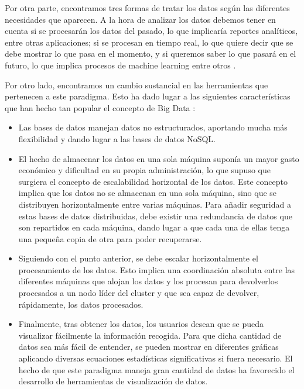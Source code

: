 Por otra parte, encontramos tres formas de tratar los datos según las
diferentes necesidades que aparecen. A la hora de analizar los datos
debemos tener en cuenta si se procesarán los datos del pasado, lo que
implicaría reportes analíticos, entre otras aplicaciones; si se procesan en
tiempo real, lo que quiere decir que se debe mostrar lo que pasa en el
momento, y si queremos saber lo que pasará en el futuro, lo que implica
procesos de machine learning entre otros \cite{BD-3}.

Por otro lado, encontramos un cambio sustancial en las herramientas que
pertenecen a este paradigma. Esto ha dado lugar a las siguientes
características que han hecho tan popular el concepto de Big Data
\cite{BD-6}:

\begin{itemize}
\item Las bases de datos manejan datos no estructurados, aportando mucha
  más flexibilidad y dando lugar a las bases de datos NoSQL.
\item El hecho de almacenar los datos en una sola máquina suponía un mayor
  gasto económico y dificultad en su propia administración, lo que supuso
  que surgiera el concepto de escalabilidad horizontal de los datos. Este
  concepto implica que los datos no se almacenan en una sola máquina, sino
  que se distribuyen horizontalmente entre varias máquinas. Para añadir
  seguridad a estas bases de datos distribuidas, debe existir una
  redundancia de datos que son repartidos en cada máquina, dando lugar a
  que cada una de ellas tenga una pequeña copia de otra para poder
  recuperarse.
\item Siguiendo con el punto anterior, se debe escalar horizontalmente el
  procesamiento de los datos. Esto implica una coordinación absoluta entre
  las diferentes máquinas que alojan los datos y los procesan para
  devolverlos procesados a un nodo líder del cluster y que sea capaz de
  devolver, rápidamente, los datos procesados.
\item Finalmente, tras obtener los datos, los usuarios desean que se pueda
  visualizar fácilmente la información recogida. Para que dicha cantidad de
  datos sea más fácil de entender, se pueden mostrar en diferentes
  gráficas aplicando diversas ecuaciones estadísticas significativas si
  fuera necesario. El hecho de que este paradigma maneja gran cantidad de
  datos ha favorecido el desarrollo de herramientas de visualización de
  datos.
\end{itemize}


